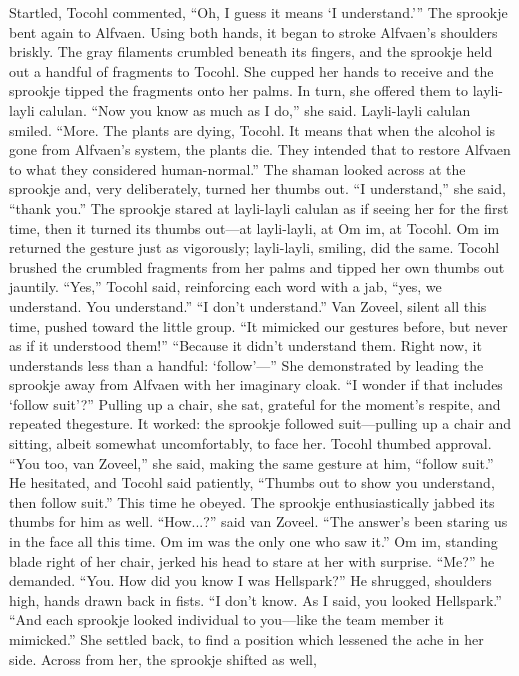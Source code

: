 \documentclass[9pt]{article}
\begin{document}
Startled, Tocohl commented, “Oh, I guess it means ‘I understand.’”
The sprookje bent again to Alfvaen. Using both hands, it began to stroke Alfvaen’s shoulders briskly.
The gray filaments crumbled beneath its fingers, and the sprookje held out a handful of fragments to
Tocohl.
She cupped her hands to receive and the sprookje tipped the fragments onto her palms. In turn, she
offered them to layli-layli calulan. “Now you know as much as I do,” she said.
Layli-layli calulan smiled. “More. The plants are dying, Tocohl. It means that when the alcohol is
gone from Alfvaen’s system, the plants die. They intended that to restore Alfvaen to what they
considered human-normal.” The shaman looked across at the sprookje and, very deliberately, turned her
thumbs out. “I understand,” she said, “thank you.”
The sprookje stared at layli-layli calulan as if seeing her for the first time, then it turned its thumbs
out—at layli-layli, at Om im, at Tocohl. Om im returned the gesture just as vigorously; layli-layli,
smiling, did the same. Tocohl brushed the crumbled fragments from her palms and tipped her own
thumbs out jauntily.
“Yes,” Tocohl said, reinforcing each word with a jab, “yes, we understand. You understand.”
“I don’t understand.” Van Zoveel, silent all this time, pushed toward the little group. “It mimicked our
gestures before, but never as if it understood them!”
“Because it didn’t understand them. Right now, it understands less than a handful: ‘follow’—” She
demonstrated by leading the sprookje away from Alfvaen with her imaginary cloak. “I wonder if that
includes ‘follow suit’?” Pulling up a chair, she sat, grateful for the moment’s respite, and repeated thegesture. It worked: the sprookje followed suit—pulling up a chair and sitting, albeit somewhat
uncomfortably, to face her. Tocohl thumbed approval. “You too, van Zoveel,” she said, making the same
gesture at him, “follow suit.”
He hesitated, and Tocohl said patiently, “Thumbs out to show you understand, then follow suit.” This
time he obeyed.
The sprookje enthusiastically jabbed its thumbs for him as well.
“How...?” said van Zoveel.
“The answer’s been staring us in the face all this time. Om im was the only one who saw it.”
Om im, standing blade right of her chair, jerked his head to stare at her with surprise. “Me?” he
demanded.
“You. How did you know I was Hellspark?”
He shrugged, shoulders high, hands drawn back in fists. “I don’t know. As I said, you looked
Hellspark.”
“And each sprookje looked individual to you—like the team member it mimicked.” She settled back,
to find a position which lessened the ache in her side. Across from her, the sprookje shifted as well,
\end{document}
